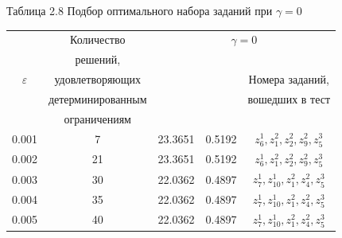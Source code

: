 \documentclass[14pt, a4paper]{extarticle}
\numberwithin{equation}{section}
\begin{document}
{\begin{table}[h!]
\centering
\begin{flushright}
Таблица 2.8 Подбор оптимального набора заданий при $\gamma=0$
\end{flushright}
\begin{tabular}{|c|c|c|c|c|}
\hline
            	& Количество        & \multicolumn{3}{c|}{$\gamma = 0$}	                        					 \\ \cline{3-5}
				& решений,          & \multirow{4}{80pt}{\centering{Значение квантили $\varphi^\ast$ (минуты)}}	&\multirow{4}{60pt}{\centering{Значение критерия $\psi^\ast$}} &   			 \\
$\varepsilon$	& удовлетворяющих	&               &       				& Номера заданий,						 \\
				& детерминированным	&               &       				& вошедших в тест  						 \\
				& ограничениям		&       		&           			&                 						 \\ \cline{1-5}
0.001			& 7			        & 23.3651 		& 0.5192				& $z^1_6, z^2_1, z^2_2, z^2_9, z^3_5$	 \\ \cline{1-5}		
0.002			& 21		        & 23.3651		& 0.5192				& $z^1_6, z^2_1, z^2_2, z^2_9, z^3_5$    \\ \cline{1-5}
0.003			& 30		        & 22.0362		& 0.4897				& $z^1_7, z^1_{10}, z^2_1, z^2_4, z^3_5$ \\ \cline{1-5}					
0.004			& 35		        & 22.0362		& 0.4897				& $z^1_7, z^1_{10}, z^2_1, z^2_4, z^3_5$ \\ \cline{1-5}			
0.005			& 40		        & 22.0362		& 0.4897				& $z^1_7, z^1_{10}, z^2_1, z^2_4, z^3_5$ \\ \cline{1-5}	
\end{tabular}
\label{ch2}
\end{table}


}
\end{document}
